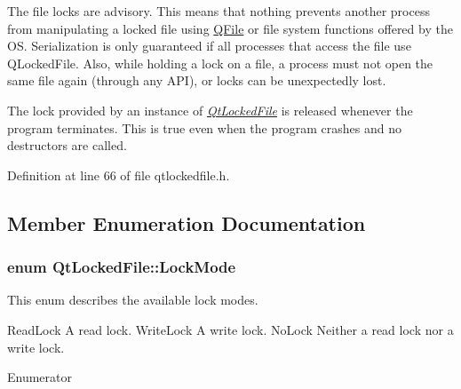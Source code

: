 The file locks are advisory. This means that nothing prevents another process from manipulating a locked file using \hyperlink{class_q_file}{Q\-File} or file system functions offered by the O\-S. Serialization is only guaranteed if all processes that access the file use Q\-Locked\-File. Also, while holding a lock on a file, a process must not open the same file again (through any A\-P\-I), or locks can be unexpectedly lost.

The lock provided by an instance of {\itshape \hyperlink{class_qt_locked_file}{Qt\-Locked\-File}} is released whenever the program terminates. This is true even when the program crashes and no destructors are called. 

Definition at line 66 of file qtlockedfile.\-h.



\subsection{Member Enumeration Documentation}
\hypertarget{class_qt_locked_file_aef385609a0a280b52334b972b04074cc}{
\subsubsection[{Lock\-Mode}]{\setlength{\rightskip}{0pt plus 5cm}enum {\bf Qt\-Locked\-File\-::\-Lock\-Mode}}}\label{class_qt_locked_file_aef385609a0a280b52334b972b04074cc}
This enum describes the available lock modes.

Read\-Lock A read lock.  Write\-Lock A write lock.  No\-Lock Neither a read lock nor a write lock. \begin{Desc}
\item[Enumerator]\par
\begin{description}
\item[{\em 
\hypertarget{class_qt_locked_file_aef385609a0a280b52334b972b04074ccaecfd72691ebf45adb30ced8f2ce083ba}{No\-Lock}\label{class_qt_locked_file_aef385609a0a280b52334b972b04074ccaecfd72691ebf45adb30ced8f2ce083ba}
}]\item[{\em 
\hypertarget{class_qt_locked_file_aef385609a0a280b52334b972b04074ccaa7d019059a9ef326be5f044dc7b411b7}{Read\-Lock}\label{class_qt_locked_file_aef385609a0a280b52334b972b04074ccaa7d019059a9ef326be5f044dc7b411b7}
}]\item[{\em 
\hypertarget{class_qt_locked_file_aef385609a0a280b52334b972b04074cca780a3a586dde80736c8fe2e6c5d3cc8d}{Write\-Lock}\label{class_qt_locked_file_aef385609a0a280b52334b972b04074cca780a3a586dde80736c8fe2e6c5d3cc8d}
}]\end{description}
\end{Desc}


